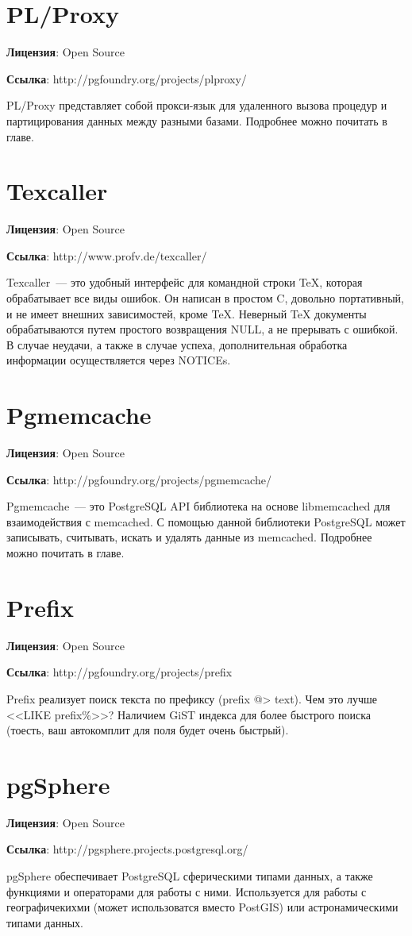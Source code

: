 \section{PL/Proxy}
\textbf{Лицензия}: Open Source

\textbf{Ссылка}: http://pgfoundry.org/projects/plproxy/

PL/Proxy представляет собой прокси-язык для удаленного вызова процедур и партицирования данных между разными базами. 
Подробнее можно почитать в  главе.

\section{Texcaller}
\textbf{Лицензия}: Open Source

\textbf{Ссылка}: http://www.profv.de/texcaller/

Texcaller~--- это удобный интерфейс для командной строки TeX, которая обрабатывает все виды ошибок. Он написан в простом C, довольно портативный, 
и не имеет внешних зависимостей, кроме TeX. Неверный TeX документы обрабатываются путем простого возвращения NULL, 
а не прерывать с ошибкой. В случае неудачи, а также в случае успеха, дополнительная обработка информации осуществляется через NOTICEs.

\section{Pgmemcache}
\textbf{Лицензия}: Open Source

\textbf{Ссылка}: http://pgfoundry.org/projects/pgmemcache/

Pgmemcache~--- это PostgreSQL API библиотека на основе libmemcached для взаимодействия с memcached. С помощью данной библиотеки 
PostgreSQL может записывать, считывать, искать и удалять данные из memcached. Подробнее можно почитать в  главе.

\section{Prefix}
\textbf{Лицензия}: Open Source

\textbf{Ссылка}: http://pgfoundry.org/projects/prefix

Prefix реализует поиск текста по префиксу (prefix @> text). Чем это лучше <<LIKE prefix\%>>?
Наличием GiST индекса для более быстрого поиска (тоесть, ваш автокомплит для поля будет очень быстрый).

\section{pgSphere}
\textbf{Лицензия}: Open Source

\textbf{Ссылка}: http://pgsphere.projects.postgresql.org/

pgSphere обеспечивает PostgreSQL сферическими типами данных, а также функциями и операторами для работы с ними. 
Используется для работы с географичекихми (может использоватся вместо PostGIS) или астронамическими типами данных.